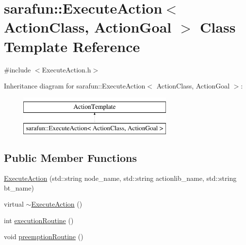 \hypertarget{classsarafun_1_1ExecuteAction}{\section{sarafun\-:\-:Execute\-Action$<$ Action\-Class, Action\-Goal $>$ Class Template Reference}
\label{classsarafun_1_1ExecuteAction}
}


{\ttfamily \#include $<$Execute\-Action.\-h$>$}

Inheritance diagram for sarafun\-:\-:Execute\-Action$<$ Action\-Class, Action\-Goal $>$\-:\begin{figure}[H]
\begin{center}
\leavevmode
\includegraphics[height=2.000000cm]{classsarafun_1_1ExecuteAction}
\end{center}
\end{figure}
\subsection*{Public Member Functions}
\begin{DoxyCompactItemize}
\item 
\hyperlink{classsarafun_1_1ExecuteAction_acbe4336af2941a52a96aaaceb7e801cb}{Execute\-Action} (std\-::string node\-\_\-name, std\-::string actionlib\-\_\-name, std\-::string bt\-\_\-name)
\item 
virtual \hyperlink{classsarafun_1_1ExecuteAction_a194ac46f85d7c70c0aa4f09a0c2941ae}{$\sim$\-Execute\-Action} ()
\item 
int \hyperlink{classsarafun_1_1ExecuteAction_ae5e3d1f2779c12923ccdc6289ebba25a}{execution\-Routine} ()
\item 
void \hyperlink{classsarafun_1_1ExecuteAction_a4075792022071239c6e335c32c70ad2e}{preemption\-Routine} ()
\end{DoxyCompactItemize}
